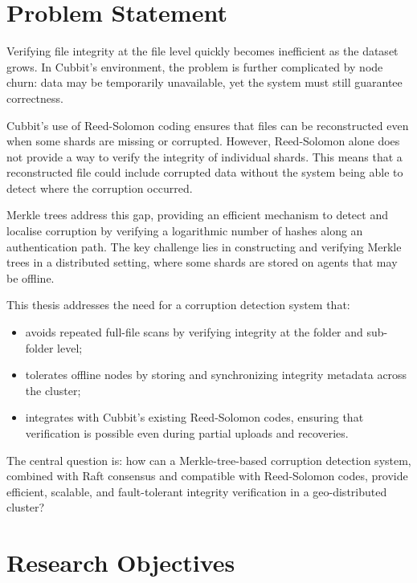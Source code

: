 \section{Problem Statement}
Verifying file integrity at the file level quickly becomes inefficient as the dataset grows. In Cubbit's environment, the problem is further complicated by node churn: data may be temporarily unavailable, yet the system must still guarantee correctness.

Cubbit's use of Reed-Solomon coding ensures that files can be reconstructed even when some shards are missing or corrupted. However, Reed-Solomon alone does not provide a way to verify the integrity of individual shards. This means that a reconstructed file could include corrupted data without the system being able to detect where the corruption occurred.

Merkle trees address this gap, providing an efficient mechanism to detect and localise corruption by verifying a logarithmic number of hashes along an authentication path. The key challenge lies in constructing and verifying Merkle trees in a distributed setting, where some shards are stored on agents that may be offline.

This thesis addresses the need for a corruption detection system that:
\begin{itemize}
\item avoids repeated full-file scans by verifying integrity at the folder and sub-folder level;
\item tolerates offline nodes by storing and synchronizing integrity metadata across the cluster;
\item integrates with Cubbit’s existing Reed-Solomon codes, ensuring that verification is possible even during partial uploads and recoveries.
\end{itemize}

The central question is: how can a Merkle-tree-based corruption detection system, combined with Raft consensus and compatible with Reed-Solomon codes, provide efficient, scalable, and fault-tolerant integrity verification in a geo-distributed cluster?

\section{Research Objectives}

